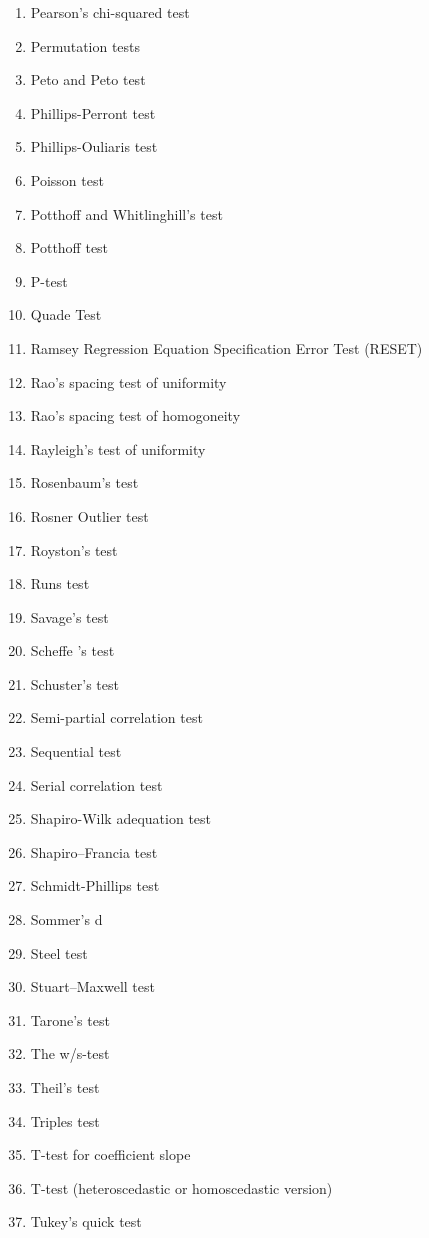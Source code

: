 \begin{itemize}
\begin{multicols}{3}
\begin{enumerate}
			\item Pearson's chi-squared test
			\item Permutation tests
			\item Peto and Peto test
			\item Phillips-Perront test
			\item Phillips-Ouliaris test
			\item Poisson test
			\item Potthoff and Whitlinghill's test
			\item Potthoff test
			\item P-test
			\item Quade Test
			\item Ramsey Regression Equation Specification Error Test (RESET)
			\item Rao's spacing test of uniformity
			\item Rao's spacing test of homogoneity
			\item Rayleigh's test of uniformity
			\item Rosenbaum's test
			\item Rosner Outlier test
			\item Royston's test
			\item Runs test
			\item Savage's test
			\item Scheffe 's test
			\item Schuster's test
			\item Semi-partial correlation test
			\item Sequential test
			\item Serial correlation test
			\item Shapiro-Wilk adequation test
			\item Shapiro–Francia test
			\item Schmidt-Phillips test
			\item Sommer's d 
			\item Steel test
			\item Stuart–Maxwell test
			\item Tarone's test
			\item The w/s-test
			\item Theil's test
			\item Triples test
			\item T-test for coefficient slope
			\item T-test (heteroscedastic or homoscedastic version)
			\item Tukey's quick test

\end{enumerate}
\end{multicols}
\end{itemize}
